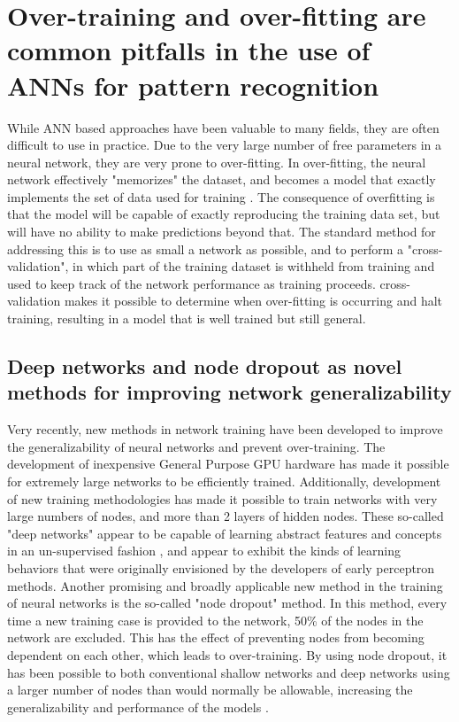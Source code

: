 \section{Over-training and over-fitting are common pitfalls in the use of \acs{ANN}s for pattern recognition}
\label{sec:intro_overtraining}
While \ac{ANN} based approaches have been valuable to many fields, they are often difficult to use in practice.
Due to the very large number of free parameters in a neural network, they are very prone to over-fitting.
In over-fitting, the neural network effectively "memorizes" the dataset, and becomes a model that exactly implements the set of data used for training \citep{Tetko:1995cm}.
The consequence of overfitting is that the model will be capable of exactly reproducing the training data set, but will have no ability to make predictions beyond that.
The standard method for addressing this is to use as small a network as possible, and to perform a "cross-validation", in which part of the training dataset is withheld from training and used to keep track of the network performance as training proceeds.
cross-validation makes it possible to determine when over-fitting is occurring and halt training, resulting in a model that is well trained but still general.

\subsection{Deep networks and node dropout as novel methods for improving network generalizability}
Very recently, new methods in network training have been developed to improve the generalizability of neural networks and prevent over-training.
The development of inexpensive General Purpose \ac{GPU} hardware has made it possible for extremely large networks to be efficiently trained. 
Additionally, development of new training methodologies \citep{Hinton:2006dy} has made it possible to train networks with very large numbers of nodes, and more than 2 layers of hidden nodes.
These so-called "deep networks" appear to be capable of learning abstract features and concepts in an un-supervised fashion \citep{Le:2013kz}, and appear to exhibit the kinds of learning behaviors that were originally envisioned by the developers of early perceptron methods. 
Another promising and broadly applicable new method in the training of neural networks is the so-called "node dropout" method.
In this method, every time a new training case is provided to the network, 50\% of the nodes in the network are excluded.
This has the effect of preventing nodes from becoming dependent on each other, which leads to over-training.
By using node dropout, it has been possible to both conventional shallow networks and deep networks using a larger number of nodes than would normally be allowable, increasing the generalizability and performance of the models \citep{Hinton:2012tv}.

